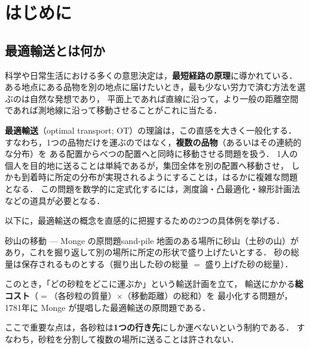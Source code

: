 \chapter{はじめに}
\label{ch:introduction}

\section{最適輸送とは何か}
\label{sec:what-is-ot}

科学や日常生活における多くの意思決定は，\textbf{最短経路の原理}に導かれている．
ある地点にある品物を別の地点に届けたいとき，最も少ない労力で済む方法を選ぶのは自然な発想であり，
平面上であれば直線に沿って，より一般の距離空間であれば測地線に沿って移動させることがこれに当たる．

\textbf{最適輸送}（optimal transport; OT）の理論は，この直感を大きく一般化する．
すなわち，1つの品物だけを運ぶのではなく，\textbf{複数の品物}（あるいはその連続的な分布）を
ある配置からべつの配置へと同時に移動させる問題を扱う．
1人の個人を目的地に送ることは単純であるが，集団全体を別の配置へ移動させ，
しかも到着時に所定の分布が実現されるようにすることは，はるかに複雑な問題となる．
この問題を数学的に定式化するには，測度論・凸最適化・線形計画法などの道具が必要となる．

以下に，最適輸送の概念を直感的に把握するための2つの具体例を挙げる．

\begin{example}{砂山の移動 --- Monge の原問題}{sand-pile}
  地面のある場所に砂山（土砂の山）があり，これを掘り返して別の場所に所定の形状で盛り上げたいとする．
  砂の総量は保存されるものとする（掘り出した砂の総量 $=$ 盛り上げた砂の総量）．

  このとき，「どの砂粒をどこに運ぶか」という輸送計画を立て，
  輸送にかかる\textbf{総コスト}（$=$（各砂粒の質量）$\times$（移動距離）の総和）を
  最小化する問題が，1781年に Monge が提唱した最適輸送の原問題である．

  ここで重要な点は，各砂粒は\textbf{1つの行き先}にしか運べないという制約である．
  すなわち，砂粒を分割して複数の場所に送ることは許されない．
\end{example}

